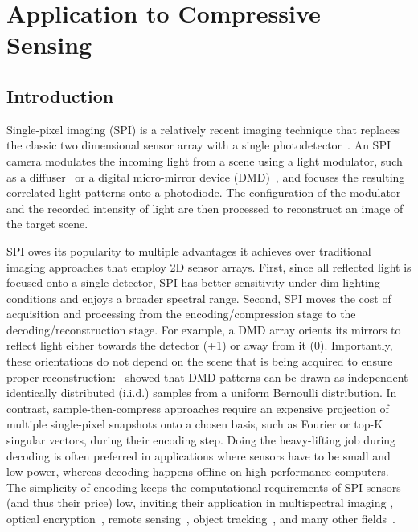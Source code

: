 \section{Application to Compressive Sensing}
\label{ch:cs}
\subsection{Introduction}
Single-pixel imaging (SPI) is a relatively recent imaging technique that replaces the classic two dimensional sensor array with a single photodetector~\cite{bian2018experimental}. An SPI camera modulates the incoming light from a scene using a light modulator, such as a diffuser~\cite{guo2016multilayer} or a digital micro-mirror device (DMD)~\cite{pittman1995optical, sampsell1993overview}, and focuses the resulting correlated light patterns onto a photodiode. The configuration of the modulator and the recorded intensity of light are then processed to reconstruct an image of the target scene.

SPI owes its popularity to multiple advantages it achieves over traditional imaging approaches that employ 2D sensor arrays. First, since all reflected light is focused onto a single detector, SPI has better sensitivity under dim lighting conditions and enjoys a broader spectral range\cite{Edgar2019}. Second, SPI moves the cost of acquisition and processing from the encoding/compression stage to the decoding/reconstruction stage. For example, a DMD array orients its mirrors to reflect light either towards the detector (+1) or away from it (0). Importantly, these orientations do not depend on the scene that is being acquired to ensure proper reconstruction: \cite{baraniuk2008simple}~showed that DMD patterns can be drawn as independent identically distributed (i.i.d.) samples from a uniform Bernoulli distribution. In contrast, sample-then-compress approaches\cite{skodras2001jpeg} require an expensive projection of multiple single-pixel snapshots onto a chosen basis, such as Fourier or top-K singular vectors, during their encoding step. Doing the heavy-lifting job during decoding is often preferred in applications where sensors have to be small and low-power, whereas decoding happens offline on high-performance computers. The simplicity of encoding keeps the computational requirements of SPI sensors (and thus their price) low, inviting their application in multispectral imaging \cite{bian2016multispectral,li2017efficient}, optical encryption~\cite{chen2013ghost}, remote sensing~\cite{zhao2012ghost}, object tracking~\cite{li2014ghost}, and many other fields~\cite{sun20133d,zhang2010correlated,cheng2009ghost}.

